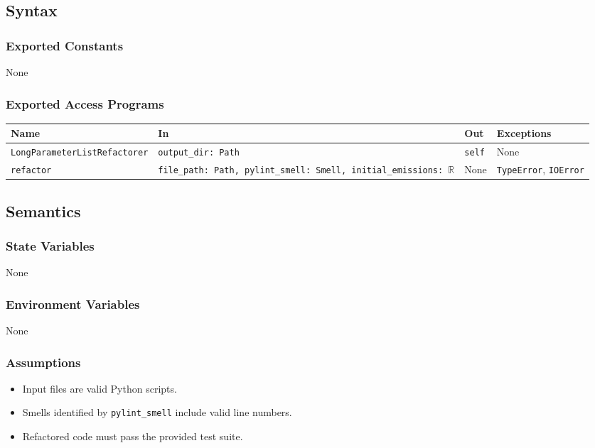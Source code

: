 \documentclass[12pt, titlepage]{article}
\begin{document}
\subsection{Syntax}

\subsubsection{Exported Constants}

None

\subsubsection{Exported Access Programs}

\begin{center}
\begin{tabularx}{\linewidth}{|l|>{\raggedright\arraybackslash}X|l|l|}
\hline
\textbf{Name} & \textbf{In} & \textbf{Out} & \textbf{Exceptions} \\
\hline
\texttt{LongParameterListRefactorer} & \texttt{output\_dir: Path} & \texttt{self} & None \\
\hline
\texttt{refactor} & \texttt{file\_path: Path, pylint\_smell: Smell, initial\_emissions: $\mathbb{R}$} & None & \texttt{TypeError}, \texttt{IOError} \\
\hline
\end{tabularx}
\end{center}

\subsection{Semantics}

\subsubsection{State Variables}

None

\subsubsection{Environment Variables}
None

\subsubsection{Assumptions}

\begin{itemize}
  \item Input files are valid Python scripts.
  \item Smells identified by \texttt{pylint\_smell} include valid line numbers.
  \item Refactored code must pass the provided test suite.
\end{itemize}
\end{document}
